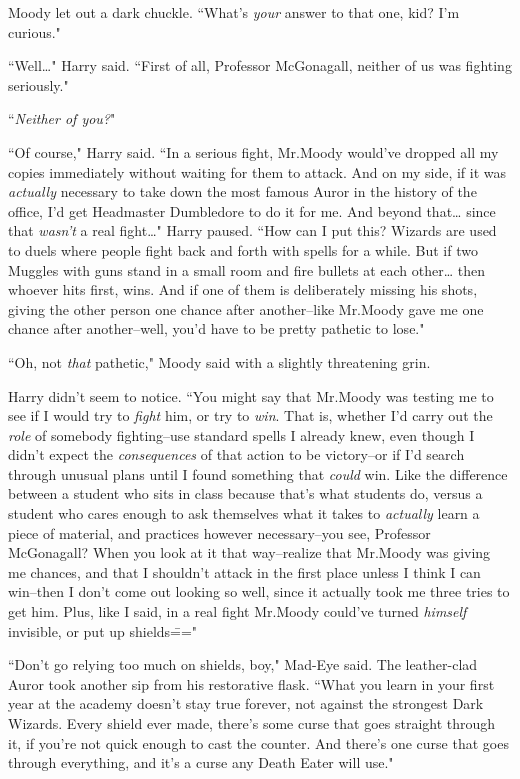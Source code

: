 Moody let out a dark chuckle. ``What's \emph{your} answer to that one, kid? I'm curious."

``Well{\ldots}" Harry said. ``First of all, Professor McGonagall, neither of us was fighting seriously."

``\emph{Neither of you?}"

``Of course," Harry said. ``In a serious fight, Mr.\?Moody would've dropped all my copies immediately without waiting for them to attack. And on my side, if it was \emph{actually} necessary to take down the most famous Auror in the history of the office, I'd get Headmaster Dumbledore to do it for me. And beyond that{\ldots} since that \emph{wasn't} a real fight{\ldots}" Harry paused. ``How can I put this? Wizards are used to duels where people fight back and forth with spells for a while. But if two Muggles with guns stand in a small room and fire bullets at each other{\ldots} then whoever hits first, wins. And if one of them is deliberately missing his shots, giving the other person one chance after another\---like Mr.\?Moody gave me one chance after another\---well, you'd have to be pretty pathetic to lose."

``Oh, not \emph{that} pathetic," Moody said with a slightly threatening grin.

Harry didn't seem to notice. ``You might say that Mr.\?Moody was testing me to see if I would try to \emph{fight} him, or try to \emph{win}. That is, whether I'd carry out the \emph{role} of somebody fighting\---use standard spells I already knew, even though I didn't expect the \emph{consequences} of that action to be victory\---or if I'd search through unusual plans until I found something that \emph{could} win. Like the difference between a student who sits in class because that's what students do, versus a student who cares enough to ask themselves what it takes to \emph{actually} learn a piece of material, and practices however necessary\---you see, Professor McGonagall? When you look at it that way\---realize that Mr.\?Moody was giving me chances, and that I shouldn't attack in the first place unless I think I can win\---then I don't come out looking so well, since it actually took me three tries to get him. Plus, like I said, in a real fight Mr.\?Moody could've turned \emph{himself} invisible, or put up shields\==="

``Don't go relying too much on shields, boy," Mad-Eye said. The leather-clad Auror took another sip from his restorative flask. ``What you learn in your first year at the academy doesn't stay true forever, not against the strongest Dark Wizards. Every shield ever made, there's some curse that goes straight through it, if you're not quick enough to cast the counter. And there's one curse that goes through everything, and it's a curse any Death Eater will use."


